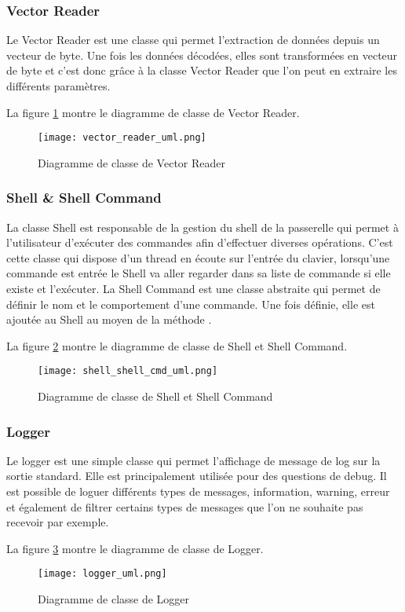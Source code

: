 \subsubsection{Vector Reader}

Le Vector Reader est une classe qui permet l'extraction de données depuis un vecteur de byte.  Une fois les données décodées, elles sont transformées en vecteur de byte et c'est donc grâce à la classe Vector Reader que l'on peut en extraire les différents paramètres.

La figure \ref{fig:vector_reader_uml} montre le diagramme de classe de Vector Reader.

\begin{figure}[htb]
\centering 
\texttt{[image: vector\_reader\_uml.png]} 
\caption{Diagramme de classe de Vector Reader}
\label{fig:vector_reader_uml}
 \end{figure}

\subsubsection{Shell \& Shell Command}

La classe Shell est responsable de la gestion du shell de la passerelle qui permet à l'utilisateur d'exécuter des commandes afin d'effectuer diverses opérations. C'est cette classe qui dispose d'un thread en écoute sur l'entrée du clavier, lorsqu'une commande est entrée le Shell va aller regarder dans sa liste de commande si elle existe et l'exécuter.
La Shell Command est une classe abstraite qui permet de définir le nom et le comportement d'une commande. Une fois définie, elle est ajoutée au Shell au moyen de la méthode .

La figure \ref{fig:shell_shell_cmd_uml} montre le diagramme de classe de Shell et Shell Command.

\begin{figure}[htb]
\centering 
\texttt{[image: shell\_shell\_cmd\_uml.png]} 
\caption{Diagramme de classe de Shell et Shell Command}
\label{fig:shell_shell_cmd_uml}
 \end{figure}

\subsubsection{Logger}

Le logger est une simple classe qui permet l'affichage de message de log sur la sortie standard. Elle est principalement utilisée pour des questions de debug. Il est possible de loguer différents types de messages, information, warning, erreur et également de filtrer certains types de messages que l'on ne souhaite pas recevoir par exemple.

La figure \ref{fig:logger_uml} montre le diagramme de classe de Logger.

\begin{figure}[htb]
\centering 
\texttt{[image: logger\_uml.png]} 
\caption{Diagramme de classe de Logger}
\label{fig:logger_uml}
 \end{figure}
